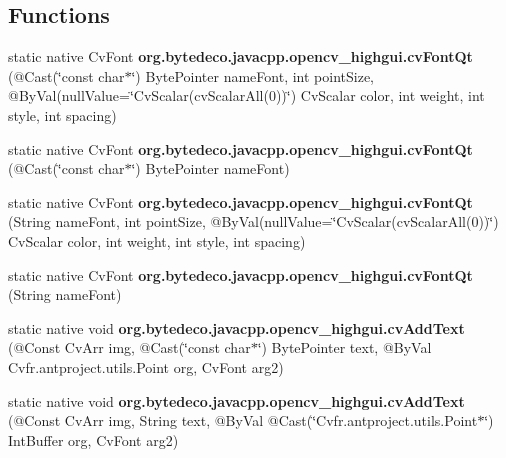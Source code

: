 \subsection*{Functions}
\begin{DoxyCompactItemize}
\item 
\mbox{\label{group__highgui__c_gaea43cae864e7d280e73ecd7aa3b8e70a}} 
static native Cv\+Font {\bfseries org.\+bytedeco.\+javacpp.\+opencv\+\_\+highgui.\+cv\+Font\+Qt} (@Cast(\char`\"{}const char$\ast$\char`\"{}) Byte\+Pointer name\+Font, int point\+Size, @By\+Val(null\+Value=\char`\"{}Cv\+Scalar(cv\+Scalar\+All(0))\char`\"{}) Cv\+Scalar color, int weight, int style, int spacing)
\item 
\mbox{\label{group__highgui__c_ga013a1b8007c8c5a6ab59e03896cfe93a}} 
static native Cv\+Font {\bfseries org.\+bytedeco.\+javacpp.\+opencv\+\_\+highgui.\+cv\+Font\+Qt} (@Cast(\char`\"{}const char$\ast$\char`\"{}) Byte\+Pointer name\+Font)
\item 
\mbox{\label{group__highgui__c_gaf88f7079ca1c84b149cb1f9c2da11a75}} 
static native Cv\+Font {\bfseries org.\+bytedeco.\+javacpp.\+opencv\+\_\+highgui.\+cv\+Font\+Qt} (String name\+Font, int point\+Size, @By\+Val(null\+Value=\char`\"{}Cv\+Scalar(cv\+Scalar\+All(0))\char`\"{}) Cv\+Scalar color, int weight, int style, int spacing)
\item 
\mbox{\label{group__highgui__c_gaabe9adf54474871a2f63250132ba5abc}} 
static native Cv\+Font {\bfseries org.\+bytedeco.\+javacpp.\+opencv\+\_\+highgui.\+cv\+Font\+Qt} (String name\+Font)
\item 
\mbox{\label{group__highgui__c_ga7fd28368e1fcdb7efa7861fdd59f6f93}} 
static native void {\bfseries org.\+bytedeco.\+javacpp.\+opencv\+\_\+highgui.\+cv\+Add\+Text} (@Const Cv\+Arr img, @Cast(\char`\"{}const char$\ast$\char`\"{}) Byte\+Pointer text, @By\+Val Cv\+fr.antproject.utils.Point org, Cv\+Font arg2)
\item 
\mbox{\label{group__highgui__c_gaf3b5efe9c6a278f2e79c42f529208ae8}} 
static native void {\bfseries org.\+bytedeco.\+javacpp.\+opencv\+\_\+highgui.\+cv\+Add\+Text} (@Const Cv\+Arr img, String text, @By\+Val @Cast(\char`\"{}Cv\+fr.antproject.utils.Point$\ast$\char`\"{}) Int\+Buffer org, Cv\+Font arg2)

\end{DoxyCompactItemize}
